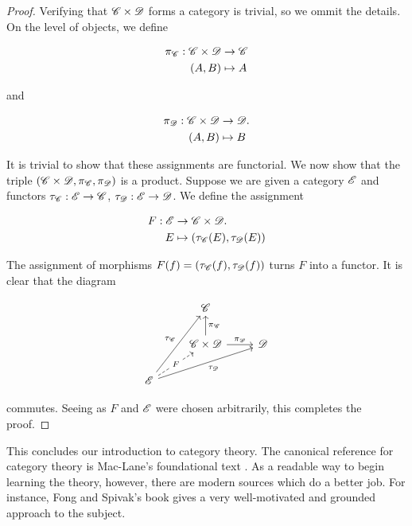 \documentclass{article}
\theoremstyle{definition}
\numberwithin{figure}{section}
\begin{document}
\begin{proof} Verifying that $\mathscr{C}\times \mathscr{D}$ forms a category is trivial, so we ommit the details. On the level of objects, we define

\begin{align*}
\pi_{\mathscr{C}}:\mathscr{C}\times \mathscr{D}&\to \mathscr{C}\\
(A,B)&\mapsto A
\end{align*}

and

\begin{align*}
\pi_{\mathscr{D}}:\mathscr{C}\times \mathscr{D}&\to \mathscr{D}.\\
(A,B)&\mapsto B
\end{align*}

It is trivial to show that these assignments are functorial. We now show that the triple $(\mathscr{C}\times\mathscr{D},\pi_{\mathscr{C}},\pi_{\mathscr{D}})$ is a product. Suppose we are given a category $\mathscr{E}$ and functors $\tau_{\mathscr{C}}:\mathscr{E}\to \mathscr{C}$, $\tau_{\mathscr{D}}:\mathscr{E}\to \mathscr{D}$. We define the assignment

\begin{align*}
F: \mathscr{E}&\to \mathscr{C}\times \mathscr{D}.\\
E&\mapsto (\tau_{\mathscr{C}}(E),\tau_{\mathscr{D}}(E))
\end{align*}

The assignment of morphisms $F(f)=(\tau_{\mathscr{C}}(f),\tau_{\mathscr{D}}(f))$ turns $F$ into a functor. It is clear that the diagram

\[\begin{tikzcd}
	& \Ccat \\
	& {\Ccat\times \Dcat} & \Dcat \\
	\Ecat
	\arrow["F"{description}, dashed, from=3-1, to=2-2]
	\arrow["{\tau_{\Dcat}}"', from=3-1, to=2-3]
	\arrow["{\tau_{\Ccat}}", from=3-1, to=1-2]
	\arrow["{\pi_{\Dcat}}", from=2-2, to=2-3]
	\arrow["{\pi_{\Ccat}}"', from=2-2, to=1-2]
\end{tikzcd}\]

commutes. Seeing as $F$ and $\mathscr{E}$ were chosen arbitrarily, this completes the proof.
\end{proof}

This concludes our introduction to category theory. The canonical reference for category theory is Mac-Lane's foundational text \cite{mac2013categories}. As a readable way to begin learning the theory, however, there are modern sources which do a better job. For instance, Fong and Spivak's book \cite{fong2019invitation} gives a very well-motivated and grounded approach to the subject.
\end{document}

